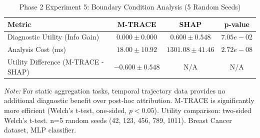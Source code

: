 
\begin{table}[h]
\centering
\caption{Phase 2 Experiment 5: Boundary Condition Analysis (5 Random Seeds)}
\label{tab:experiment5_boundary}
\begin{tabular}{lccc}
\toprule
\textbf{Metric} & \textbf{M-TRACE} & \textbf{SHAP} & \textbf{p-value} \\
\midrule
Diagnostic Utility (Info Gain) & $0.000 \pm 0.000$ & $0.600 \pm 0.548$ & $7.05e-02$ \\
\midrule
Analysis Cost (ms) & $18.00 \pm 10.92$ & $1301.08 \pm 41.46$ & $2.72e-08$ \\
\midrule
Utility Difference (M-TRACE - SHAP) & $-0.600 \pm 0.548$ & N/A & N/A \\
\bottomrule
\end{tabular}
\begin{flushleft}
\small
\textit{Note:} For static aggregation tasks, temporal trajectory data provides no additional 
diagnostic benefit over post-hoc attribution. M-TRACE is significantly more efficient 
(Welch's t-test, one-sided, $p<0.05$). Utility comparison: two-sided Welch's t-test.
n=5 random seeds (42, 123, 456, 789, 1011). Breast Cancer dataset, MLP classifier.
\end{flushleft}
\end{table}
